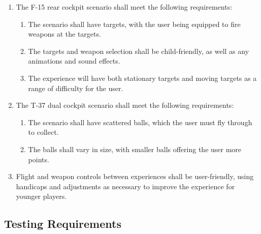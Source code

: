 \documentclass[12pt]{article} %
\begin{document}
\begin{enumerate}[label=\arabic*, leftmargin=*]
\begin{enumerate}[label=\arabic{enumi}.\arabic*, leftmargin=*]
\begin{enumerate}[label=\arabic{enumi}.\arabic{enumii}.\arabic*, leftmargin=*]
\begin{enumerate}[label=\arabic{enumi}.\arabic{enumii}.\arabic{enumiii}.\alph*, leftmargin=*]
				\item The user shall be able to gain points by flying through rings. 
				\item The scenario shall contain both obstacles, detrimental to the player's score, and pickups, improving the user's score or ability to earn points.
			\end{enumerate}
			\item The F-15 rear cockpit scenario shall meet the following requirements:
			\begin{enumerate}[label=\arabic{enumi}.\arabic{enumii}.\arabic{enumiii}.\alph*, leftmargin=*]
				\item The scenario shall have targets, with the user being equipped to fire weapons at the targets.
				\item The targets and weapon selection shall be child-friendly, as well as any animations and sound effects. 
				\item The experience will have both stationary targets and moving targets as a range of difficulty for the user. 
			\end{enumerate}
			\item The T-37 dual cockpit scenario shall meet the following requirements:
			\begin{enumerate}[label=\arabic{enumi}.\arabic{enumii}.\arabic{enumiii}.\alph*, leftmargin=*]
				\item The scenario shall have scattered balls, which the user must fly through to collect.
				\item The balls shall vary in size, with smaller balls offering the user more points. 
			\end{enumerate}
			\item Flight and weapon controls between experiences shall be user-friendly, using handicaps and adjustments as necessary to improve the experience for younger players. 
		\end{enumerate}
	\end{enumerate}
\end{enumerate}

\subsection{Testing Requirements}
\end{document}
